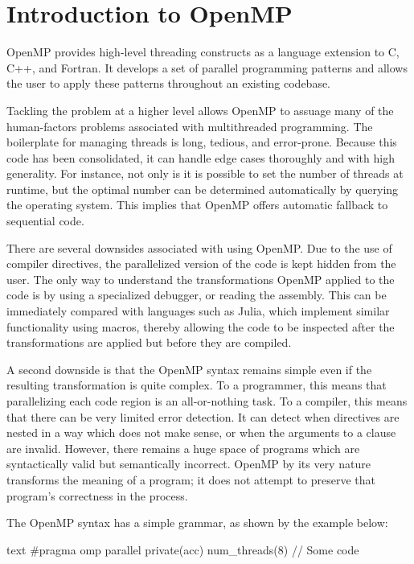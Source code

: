 \documentclass[conference, a4paper]{IEEEtran-modified}
\begin{document}
\section{Introduction to OpenMP}

    OpenMP provides high-level threading constructs as a language extension to C, C++, and Fortran. It develops a set of parallel programming patterns and allows the user to apply these patterns throughout an existing codebase.

    Tackling the problem at a higher level allows OpenMP to assuage many of the human-factors problems associated with multithreaded programming. The boilerplate for managing threads is long, tedious, and error-prone. Because this code has been consolidated, it can handle edge cases thoroughly and with high generality. For instance, not only is it is possible to set the number of threads at runtime, but the optimal number can be determined automatically by querying the operating system. This implies that OpenMP offers automatic fallback to sequential code.  

    There are several downsides associated with using OpenMP. Due to the use of compiler directives, the parallelized version of the code is kept hidden from the user. The only way to understand the transformations OpenMP applied to the code is by using a specialized debugger, or reading the assembly. This can be immediately compared with languages such as Julia, which implement similar functionality using macros, thereby allowing the code to be inspected after the transformations are applied but before they are compiled.

    A second downside is that the OpenMP syntax remains simple even if the resulting transformation is quite complex. To a programmer, this means that parallelizing each code region is an all-or-nothing task. To a compiler, this means that there can be very limited error detection. It can detect when directives are nested in a way which does not make sense, or when the arguments to a clause are invalid. However, there remains a huge space of programs which are syntactically valid but semantically incorrect. OpenMP by its very nature transforms the meaning of a program; it does not attempt to preserve that program's correctness in the process.

    The OpenMP syntax has a simple grammar, as shown by the example below:
      \begin{ccode}[]
        {text}
        #pragma omp parallel private(acc) num_threads(8) 
        {
            // Some code
        }\end{ccode}
\end{document}
